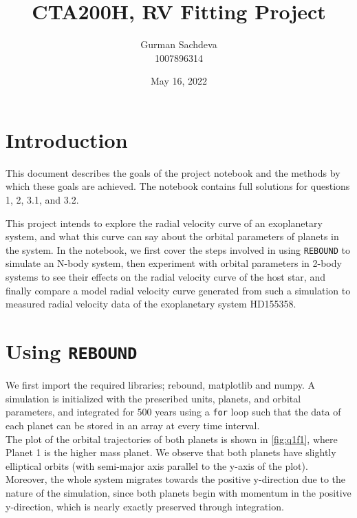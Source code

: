 \documentclass{article}
\title{CTA200H, RV Fitting Project}
\author{Gurman Sachdeva \\ 1007896314}
\date{May 16, 2022}
\newcommand{\for}{\texttt{for}}
\newcommand{\rebound}{\texttt{REBOUND}}
\begin{document}
\maketitle

\section*{Introduction}

This document describes the goals of the project notebook and the methods by which these goals are achieved. The notebook contains full solutions for questions 1, 2, 3.1, and 3.2. 

This project intends to explore the radial velocity curve of an exoplanetary system, and what this curve can say about the orbital parameters of planets in the system. In the notebook, we first cover the steps involved in using \rebound{} to simulate an N-body system, then experiment with orbital parameters in 2-body systems to see their effects on the radial velocity curve of the host star, and finally compare a model radial velocity curve generated from such a simulation to measured radial velocity data of the exoplanetary system HD155358. 

\newpage

\section{Using \rebound}
We first import the required libraries; rebound, matplotlib and numpy. A simulation is initialized with the prescribed units, planets, and orbital parameters, and integrated for 500 years using a \for{} loop such that the data of each planet can be stored in an array at every time interval. \\

The plot of the orbital trajectories of both planets is shown in \ref{fig:q1f1}, where Planet 1 is the higher mass planet. We observe that both planets have slightly elliptical orbits (with semi-major axis parallel to the y-axis of the plot). Moreover, the whole system migrates towards the positive y-direction due to the nature of the simulation, since both planets begin with momentum in the positive y-direction, which is nearly exactly preserved through integration. 
\end{document}
